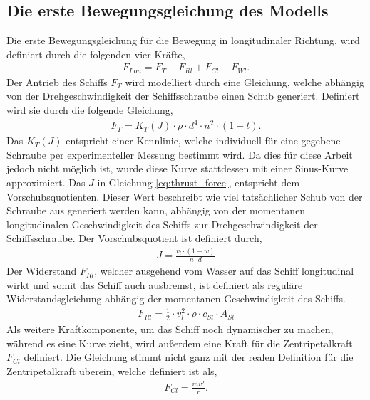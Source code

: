 \documentclass[]{iat}
\begin{document}
\subsection{Die erste Bewegungsgleichung des Modells} \label{sec:eom1}
Die erste Bewegungsgleichung für die Bewegung in longitudinaler Richtung, wird definiert durch die folgenden vier Kräfte,
\begin{align}
    F_{Lon} = F_{T} - F_{Rl} + F_{Cl} + F_{Wl}. \label{eq:longitudinal_force}
\end{align}
Der Antrieb des Schiffs $F_T$ wird modelliert durch eine Gleichung, welche abhängig von der Drehgeschwindigkeit der Schiffsschraube einen Schub generiert. Definiert wird sie durch die folgende Gleichung,
\begin{align}
    F_{T} = K_T(J) \cdot \rho \cdot d^4 \cdot n^2 \cdot (1-t). \label{eq:thrust_force}
\end{align}
Das $K_T(J)$ entspricht einer Kennlinie, welche individuell für eine gegebene Schraube per experimenteller Messung bestimmt wird. \cite[]{hydrodynamicsNinova} Da dies für diese Arbeit jedoch nicht möglich ist, wurde diese Kurve stattdessen mit einer Sinus-Kurve approximiert. Das $J$ in Gleichung \ref*{eq:thrust_force}, entspricht dem Vorschubsquotienten. \cite[]{Benedict2007ExplainingSD} Dieser Wert beschreibt wie viel tatsächlicher Schub von der Schraube aus generiert werden kann, abhängig von der momentanen longitudinalen Geschwindigkeit des Schiffs zur Drehgeschwindigkeit der Schiffsschraube. Der Vorschubsquotient ist definiert durch,
\begin{align}
    J = \frac{v_l \cdot (1-w)}{n \cdot d} \label{eq:thrust_coeffcient}
\end{align}
Der Widerstand $F_{Rl}$, welcher ausgehend vom Wasser auf das Schiff longitudinal wirkt und somit das Schiff auch ausbremst, ist definiert als reguläre Widerstandsgleichung abhängig der momentanen Geschwindigkeit des Schiffs.
\begin{align}
    F_{Rl} = \frac{1}{2} \cdot v_l^2 \cdot \rho \cdot c_{Sl} \cdot A_{Sl} \label{eq:front_resistance}
\end{align}
Als weitere Kraftkomponente, um das Schiff noch dynamischer zu machen, während es eine Kurve zieht, wird außerdem eine Kraft für die Zentripetalkraft $F_{Cl}$ definiert. Die Gleichung stimmt nicht ganz mit der realen Definition für die Zentripetalkraft überein, welche definiert ist als,
\begin{align}
    F_{Cl} = \frac{mv^2}{r}.
\end{align}
\end{document}

